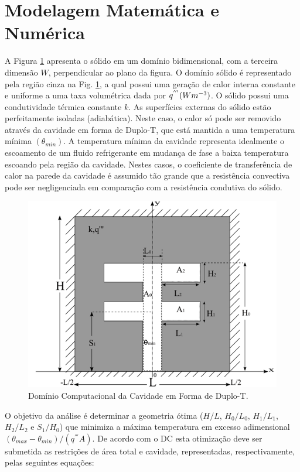 \documentclass[12pt,A4,A4pt]{article}
\begin{document}
\section{Modelagem Matemática e Numérica}
\label{modelo}
\hspace{0.5cm}A Figura \ref{figure01} apresenta o sólido em um domínio bidimensional, com a terceira dimensão $W$, perpendicular ao plano da figura. O domínio sólido é representado pela região cinza na Fig. \ref{figure01}, a qual possui uma geração de calor interna constante e uniforme a uma taxa volumétrica dada por $q^{'''}(Wm^{\tiny -3})$. O sólido possui uma condutividade térmica constante $k$. As superfícies externas do sólido estão perfeitamente isoladas (adiabática). Neste caso, o calor só pode ser removido através da cavidade em forma de Duplo-T, que está mantida a uma temperatura mínima $(\theta_{min})$. A temperatura mínima da cavidade representa idealmente o escoamento de um fluido refrigerante em mudança de fase a baixa temperatura escoando pela região da cavidade. Nestes casos, o coeficiente de transferência de calor na parede da cavidade é assumido tão grande que a resistência convectiva pode ser negligenciada em comparação com a resistência condutiva do sólido. 

\begin{figure}[h!]
\centering
\includegraphics[width=0.6\linewidth]{imgs/duplo_t.png}
\caption{ {\small Domínio Computacional da Cavidade em Forma de Duplo-T.}}
\label{figure01}
\end{figure}

O objetivo da análise é determinar a geometria ótima ($H/L$, $H_{0}/L_{0}$, $H_{1}/L_{1}$, $H_{2}/L_{2}$ e $S_{1}/H_{0}$) que minimiza a máxima temperatura em excesso adimensional $(\theta_{max} - \theta_{min})/(q^{'''}A)$. De acordo com o DC esta otimização deve ser submetida as restrições de área total e cavidade, representadas, respectivamente, pelas seguintes equações:
\end{document}
